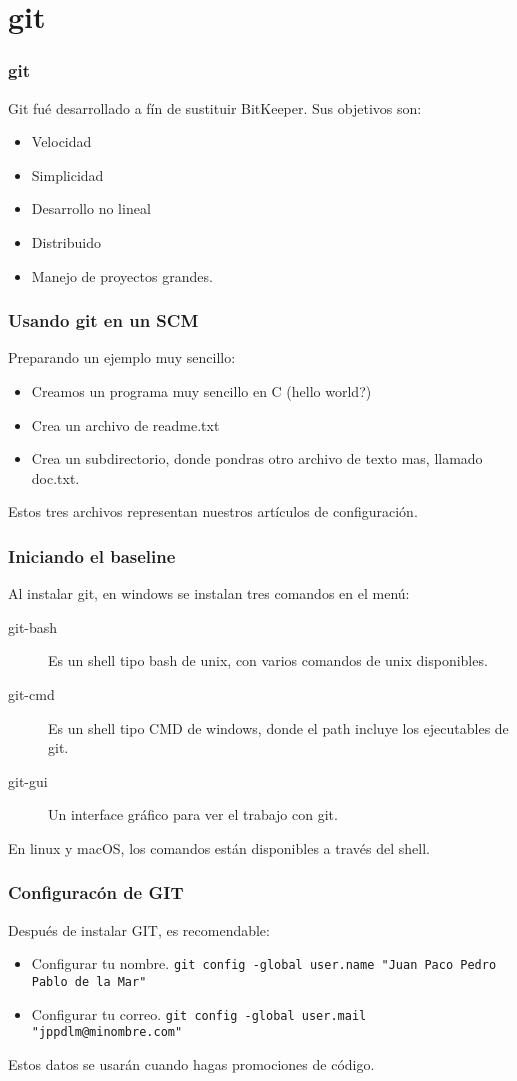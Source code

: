 \section{git}
\begin{frame}
	\frametitle{git}
	Git fu\'e desarrollado a f\'in de sustituir BitKeeper.
	Sus objetivos son:
	\begin{itemize}
		\item Velocidad
		\item Simplicidad
		\item Desarrollo no lineal
		\item Distribuido
		\item Manejo de proyectos grandes.
	\end{itemize}
\end{frame}
\begin{frame}
	\frametitle{Usando git en un SCM}
	Preparando un ejemplo muy sencillo: 
	\begin{itemize}
		\item Creamos un programa muy sencillo en C (hello world?)
		\item Crea un archivo de readme.txt 
		\item Crea un subdirectorio, donde pondras otro archivo de texto mas, llamado doc.txt. 
	\end{itemize}
	Estos tres archivos representan nuestros art\'iculos de configuraci\'on. 
\end{frame}
\begin{frame}
	\frametitle{Iniciando el baseline}
	Al instalar git, en windows se instalan tres comandos en el men\'u:
	\begin{description}
		\item [git-bash] Es un shell tipo bash de unix, con varios comandos de unix disponibles. 
		\item [git-cmd] Es un shell tipo CMD de windows, donde el path incluye los ejecutables de git. 
		\item [git-gui] Un interface gr\'afico para ver el trabajo con git. 
	\end{description}
	En linux y macOS, los comandos est\'an disponibles a trav\'es del shell. 
\end{frame}
\begin{frame}
	\frametitle{Configurac\'on de GIT}
	Despu\'es de instalar GIT, es recomendable: 
	\begin{itemize}
	\item Configurar tu nombre. \texttt{git config -global user.name "Juan Paco Pedro Pablo de la Mar"}
	\item Configurar tu correo. \texttt{git config -global user.mail "jppdlm@minombre.com"}
	\end{itemize}
	Estos datos se usar\'an cuando hagas promociones de c\'odigo. 
\end{frame}
